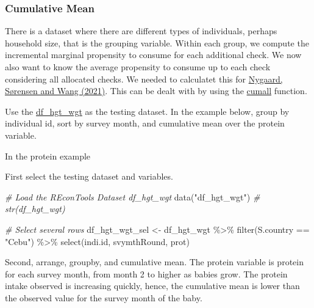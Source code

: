 \documentclass[
]{book}
\newenvironment{Shaded}{\begin{snugshade}}{\end{snugshade}}
\newcommand{\CommentTok}[1]{\textcolor[rgb]{0.56,0.35,0.01}{\textit{#1}}}
\newcommand{\FunctionTok}[1]{\textcolor[rgb]{0.00,0.00,0.00}{#1}}
\newcommand{\NormalTok}[1]{#1}
\newcommand{\OtherTok}[1]{\textcolor[rgb]{0.56,0.35,0.01}{#1}}
\newcommand{\SpecialCharTok}[1]{\textcolor[rgb]{0.00,0.00,0.00}{#1}}
\newcommand{\StringTok}[1]{\textcolor[rgb]{0.31,0.60,0.02}{#1}}
\begin{document}
\hypertarget{cumulative-mean}{%
\subsubsection{Cumulative Mean}\label{cumulative-mean}}

There is a dataset where there are different types of individuals, perhaps household size, that is the grouping variable. Within each group, we compute the incremental marginal propensity to consume for each additional check. We now also want to know the average propensity to consume up to each check considering all allocated checks. We needed to calculatet this for \href{https://papers.ssrn.com/sol3/papers.cfm?abstract_id=3691091}{Nygaard, Sørensen and Wang (2021)}. This can be dealt with by using the \href{https://dplyr.tidyverse.org/reference/cumall.html}{cumall} function.

Use the \href{https://fanwangecon.github.io/REconTools/reference/df_hgt_wgt.html}{df\_hgt\_wgt} as the testing dataset. In the example below, group by individual id, sort by survey month, and cumulative mean over the protein variable.

In the protein example

First select the testing dataset and variables.

\begin{Shaded}
\begin{Highlighting}[]
\CommentTok{\# Load the REconTools Dataset df\_hgt\_wgt}
\FunctionTok{data}\NormalTok{(}\StringTok{"df\_hgt\_wgt"}\NormalTok{)}
\CommentTok{\# str(df\_hgt\_wgt)}

\CommentTok{\# Select several rows}
\NormalTok{df\_hgt\_wgt\_sel }\OtherTok{\textless{}{-}}\NormalTok{ df\_hgt\_wgt }\SpecialCharTok{\%\textgreater{}\%} 
  \FunctionTok{filter}\NormalTok{(S.country }\SpecialCharTok{==} \StringTok{"Cebu"}\NormalTok{) }\SpecialCharTok{\%\textgreater{}\%}
  \FunctionTok{select}\NormalTok{(indi.id, svymthRound, prot)}
\end{Highlighting}
\end{Shaded}

Second, arrange, groupby, and cumulative mean. The protein variable is protein for each survey month, from month 2 to higher as babies grow. The protein intake observed is increasing quickly, hence, the cumulative mean is lower than the observed value for the survey month of the baby.
\end{document}
